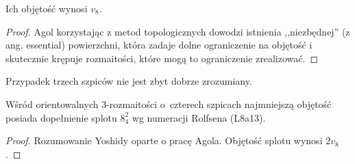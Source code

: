 
Ich objętość wynosi $v_8$.

\begin{proof}
    Agol \cite{agol10} korzystając z metod topologicznych dowodzi istnienia ,,niezbędnej'' (z ang. essential) powierzchni, która zadaje dolne ograniczenie na objętość i skutecznie krępuje rozmaitości, które mogą to ograniczenie zrealizować.
\end{proof}

Przypadek trzech szpiców nie jest zbyt dobrze zrozumiany.

\begin{proposition}
    Wśród orientowalnych 3-rozmaitości o~czterech szpicach najmniejszą objętość posiada dopełnienie splotu $8_4^2$ wg numeracji Rolfsena (L8a13).
\end{proposition}

\begin{proof}
    Rozumowanie Yoshidy \cite{yoshida13} oparte o pracę Agola.
    Objętość splotu wynosi $2v_8$.
\end{proof}



